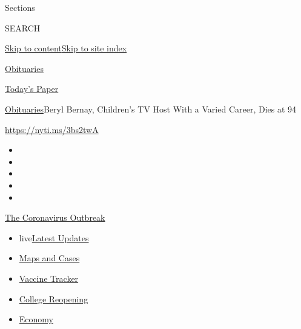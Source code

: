 Sections

SEARCH

\protect\hyperlink{site-content}{Skip to
content}\protect\hyperlink{site-index}{Skip to site index}

\href{https://www.nytimes3xbfgragh.onion/section/obituaries}{Obituaries}

\href{https://myaccount.nytimes3xbfgragh.onion/auth/login?response_type=cookie\&client_id=vi}{}

\href{https://www.nytimes3xbfgragh.onion/section/todayspaper}{Today's
Paper}

\href{/section/obituaries}{Obituaries}\textbar{}Beryl Bernay, Children's
TV Host With a Varied Career, Dies at 94

\url{https://nyti.ms/3bs2twA}

\begin{itemize}
\item
\item
\item
\item
\item
\end{itemize}

\href{https://www.nytimes3xbfgragh.onion/news-event/coronavirus?action=click\&pgtype=Article\&state=default\&region=TOP_BANNER\&context=storylines_menu}{The
Coronavirus Outbreak}

\begin{itemize}
\tightlist
\item
  live\href{https://www.nytimes3xbfgragh.onion/2020/08/03/world/coronavirus-covid-19.html?action=click\&pgtype=Article\&state=default\&region=TOP_BANNER\&context=storylines_menu}{Latest
  Updates}
\item
  \href{https://www.nytimes3xbfgragh.onion/interactive/2020/us/coronavirus-us-cases.html?action=click\&pgtype=Article\&state=default\&region=TOP_BANNER\&context=storylines_menu}{Maps
  and Cases}
\item
  \href{https://www.nytimes3xbfgragh.onion/interactive/2020/science/coronavirus-vaccine-tracker.html?action=click\&pgtype=Article\&state=default\&region=TOP_BANNER\&context=storylines_menu}{Vaccine
  Tracker}
\item
  \href{https://www.nytimes3xbfgragh.onion/2020/08/02/us/covid-college-reopening.html?action=click\&pgtype=Article\&state=default\&region=TOP_BANNER\&context=storylines_menu}{College
  Reopening}
\item
  \href{https://www.nytimes3xbfgragh.onion/live/2020/08/03/business/stock-market-today-coronavirus?action=click\&pgtype=Article\&state=default\&region=TOP_BANNER\&context=storylines_menu}{Economy}
\end{itemize}

